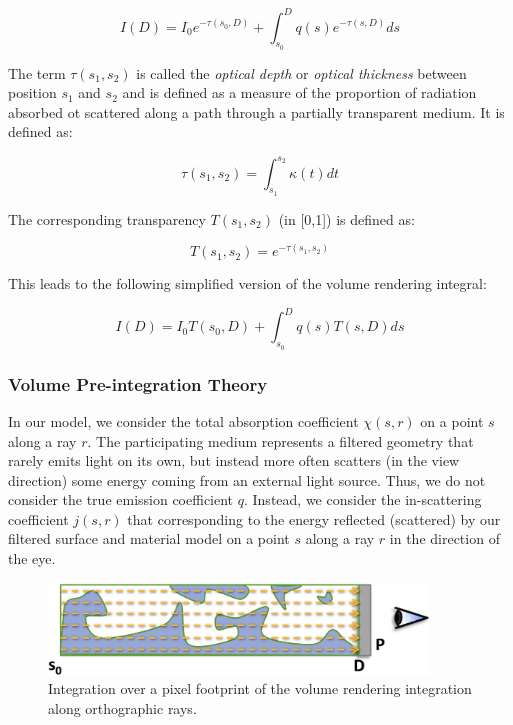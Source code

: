 \begin{equation*}
	I(D)=I_0 e^{-\tau (s_0,D)}+\int^{D}_{s_0}q(s)e^{-\tau (s,D)}ds
\end{equation*}

The term $\tau(s_1,s_2)$ is called the \textit{optical depth} or \textit{optical thickness} between position $s_1$ and $s_2$ and is defined as a measure of the proportion of radiation absorbed ot scattered along a path through a partially transparent medium. It is defined as:

\begin{equation*}
	\tau(s_1,s_2)=\int^{s_2}_{s_1}\kappa(t)dt
\end{equation*}

The corresponding transparency $T(s_1,s_2)$ (in [0,1]) is defined as:

\begin{equation*}
	T(s_1,s_2)=e^{-\tau(s_1,s_2)}
\end{equation*}

This leads to the following simplified version of the volume rendering integral:

\begin{equation*}
	I(D)=I_0T(s_0,D)+\int^{D}_{s_0}q(s)T(s,D)ds
\end{equation*}




\subsubsection{Volume Pre-integration Theory}
In our model, we consider the total absorption coefficient $\chi(s,r)$ on a point $s$ along a ray $r$. The participating medium represents a filtered geometry that rarely emits light on its own, but instead more often scatters (in the view direction) some energy coming from an external light source. Thus, we do not consider the true emission coefficient $q$. Instead, we consider the in-scattering coefficient $j(s,r)$ that corresponding to the energy reflected (scattered) by our filtered surface and material model on a point $s$ along a ray $r$ in the direction of the eye.

\begin{figure}\label{f:vct-pre-integration-1}
	\begin{center}
		\includegraphics[width=0.9\textwidth]{graphics/vct/vct-7-1}
	\end{center}
	\caption{Integration over a pixel footprint of the volume rendering integration along orthographic rays.}
\end{figure}

